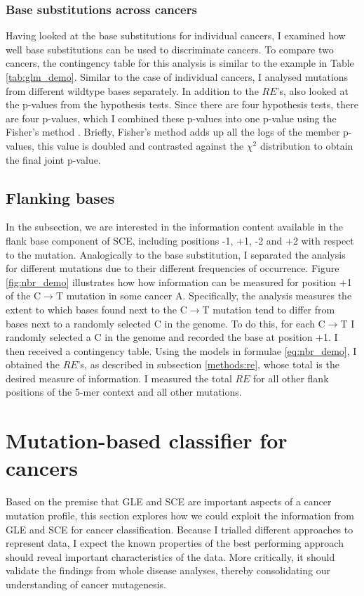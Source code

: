 \subsubsection{Base substitutions across cancers}
Having looked at the base substitutions for individual cancers, I examined how well base substitutions can be used to discriminate cancers. To compare two cancers, the contingency table for this analysis is similar to the example in Table \ref{tab:glm_demo}. Similar to the case of individual cancers, I analysed mutations from different wildtype bases separately. In addition to the $RE$'s, also looked at the p-values from the hypothesis tests. Since there are four hypothesis tests, there are four p-values, which I combined these p-values into one p-value using the Fisher's method \citep[details in \ref{apdx:fisher};][]{Fisher1992StatisticalWorkers}. Briefly, Fisher's method adds up all the logs of the member p-values, this value is doubled and contrasted against the $\chi^2$ distribution to obtain the final joint p-value.

\subsection{Flanking bases}\label{methods:nbr}
In the subsection, we are interested in the information content available in the flank base component of SCE, including positions -1, +1, -2 and +2 with respect to the mutation. Analogically to the base substitution, I separated the analysis for different mutations due to their different frequencies of occurrence. Figure \ref{fig:nbr_demo} illustrates how how information can be measured for position +1 of the C$\rightarrow$T mutation in some cancer A. Specifically, the analysis measures the extent to which bases found next to the C$\rightarrow$T mutation tend to differ from bases next to a randomly selected C in the genome. To do this, for each C$\rightarrow$T I randomly selected a C in the genome and recorded the base at position +1. I then received a contingency table. Using the models in formulae \ref{eq:nbr_demo}, I obtained the $RE$'s, as described in subsection \ref{methods:re}, whose total is the desired measure of information. I measured the total $RE$ for all other flank positions of the 5-mer context and all other mutations.



\section{Mutation-based classifier for cancers}\label{methods:ml}
Based on the premise that GLE and SCE are important aspects of a cancer mutation profile, this section explores how we could exploit the information from GLE and SCE for cancer classification. Because I trialled different approaches to represent data, I expect the known properties of the best performing approach should reveal important characteristics of the data. More critically, it should validate the findings from whole disease analyses, thereby consolidating our understanding of cancer mutagenesis.

